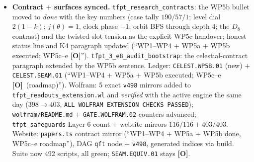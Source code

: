 \documentclass[11pt]{article}
\providecommand{\mO}{\textbf{[O]}}\providecommand{\mX}{\textbf{[X]}}
\begin{document}
\begin{itemize}[leftmargin=1.5em]
$2\theta$ has multiplicity $1$ in the level-$2$ Fock, so $U(\mathfrak g)|s\rangle$ is \emph{the}
$27000=(h^\vee)^3$; the direct $\mathfrak g_0$-orbit BFS matches the Freudenthal multiplicities of
$V(2\theta)$ exactly through depth $4$ (\mC\ Weyl complete reducibility beyond); quotient
$31124-27000=4124$; lattice reading $(2\theta,2\theta)/2=4>2$: $|s\rangle$ \emph{is} the kernel
generator of Fock $\to E_4/\eta^8$. \emph{Negative controls (honest separation)}: the level-$1$
current state $E^\theta_{-1}|0\rangle$ (one witness, $\to-k|0\rangle$ --- the $248$-current state that
must remain) and $4$ generic level-$2$ states ($14$--$33$ witnesses) are \emph{not} singular; at
$k{=}2$ the \emph{cube} is (generic Kac $(E^\theta)^{k+1}$ mechanics, honestly typed); $SO(16)_1$ has
the same singular vector but keeps three extra level-$1$ primaries ($h=\tfrac12$ breaks one-block
fusion; $5304\neq14^3$) vs $E_8$ (comarks all $\ge2$, glue weights $(0,1,1,1)$ integer) --- the
\emph{one-block closure} is the $E_8/\mu_4$-specific part. \emph{Honest} \mO: in the twisted
quarter-slot moding two sector-$C_1$ modes never sum to $8$ quarters (minimum $6=q^{3/2}$) --- the
per-period dictionary (\texttt{v496}), not the per-slot identification, carries $|s\rangle$ to $q^2$:
exactly the WP5c GNS/limit-state question; WP5c--e stay open; \texttt{SEAM.EQUIV.01} untouched.
\item \textbf{Contract $+$ surfaces synced.} \texttt{tfpt\_research\_contracts}: the WP5b bullet moved
to \emph{done} with the key numbers (case tally $190/57/1$; level dial $2(1{-}k)$; $j(\theta)=1$, clock
phase $-1$; orbit BFS through depth $4$; the $D_8$ contrast) and the twisted-slot tension as the
explicit WP5c handover; honest status line and K4 paragraph updated (``WP1--WP4 $+$ WP5a $+$ WP5b
executed; WP5c--e \mO''). \texttt{tfpt\_3\_e8\_audit\_bootstrap}: the celestial-contract paragraph
extended by the WP5b sentence. Ledger: \texttt{CELEST.WP5B.01} (new) $+$ \texttt{CELEST.SEAM.01}
(``WP1--WP4 $+$ WP5a $+$ WP5b executed; WP5c--e \mO\ (roadmap)''). Wolfram: 5 exact \texttt{v498}
mirrors added to \texttt{tfpt\_readouts\_extension.wl} and \emph{verified} with the active engine the
same day ($398\to403$, \texttt{ALL WOLFRAM EXTENSION CHECKS PASSED}); \texttt{wolfram/README.md} $+$
\texttt{GATE.WOLFRAM.02} counters advanced; \texttt{tfpt\_safeguards} Layer-6 count $+$ website mirrors
$116/116+403/403$. Website: \texttt{papers.ts} contract mirror (``WP1--WP4 $+$ WP5a $+$ WP5b done,
WP5c--e roadmap''), DAG \texttt{qft} node $+$ \texttt{v498}, generated indices via build. Suite now
492 scripts, all green; \texttt{SEAM.EQUIV.01} stays \mO.
\end{itemize}
\end{document}
